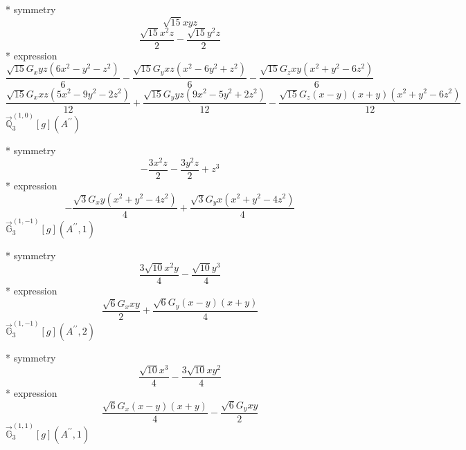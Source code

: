 \documentclass[fleqn,8pt]{jsarticle}
\begin{document}
\noindent\quad ** symmetry
\begin{dmath*}
\sqrt{15} x y z
\end{dmath*}
\begin{dmath*}
\frac{\sqrt{15} x^{2} z}{2} - \frac{\sqrt{15} y^{2} z}{2}
\end{dmath*}
\noindent\quad ** expression
\begin{dmath*}
\frac{\sqrt{15} G_{x} y z \left(6 x^{2} - y^{2} - z^{2}\right)}{6} - \frac{\sqrt{15} G_{y} x z \left(x^{2} - 6 y^{2} + z^{2}\right)}{6} - \frac{\sqrt{15} G_{z} x y \left(x^{2} + y^{2} - 6 z^{2}\right)}{6}
\end{dmath*}
\begin{dmath*}
\frac{\sqrt{15} G_{x} x z \left(5 x^{2} - 9 y^{2} - 2 z^{2}\right)}{12} + \frac{\sqrt{15} G_{y} y z \left(9 x^{2} - 5 y^{2} + 2 z^{2}\right)}{12} - \frac{\sqrt{15} G_{z} \left(x - y\right) \left(x + y\right) \left(x^{2} + y^{2} - 6 z^{2}\right)}{12}
\end{dmath*}
\noindent\quad $\vec{\mathbb{Q}}_{3}^{(1,0)}[g](A^{\prime\prime})$

\noindent\quad ** symmetry
\begin{dmath*}
- \frac{3 x^{2} z}{2} - \frac{3 y^{2} z}{2} + z^{3}
\end{dmath*}
\noindent\quad ** expression
\begin{dmath*}
- \frac{\sqrt{3} G_{x} y \left(x^{2} + y^{2} - 4 z^{2}\right)}{4} + \frac{\sqrt{3} G_{y} x \left(x^{2} + y^{2} - 4 z^{2}\right)}{4}
\end{dmath*}
\noindent\quad $\vec{\mathbb{G}}_{3}^{(1,-1)}[g](A^{\prime\prime},1)$

\noindent\quad ** symmetry
\begin{dmath*}
\frac{3 \sqrt{10} x^{2} y}{4} - \frac{\sqrt{10} y^{3}}{4}
\end{dmath*}
\noindent\quad ** expression
\begin{dmath*}
\frac{\sqrt{6} G_{x} x y}{2} + \frac{\sqrt{6} G_{y} \left(x - y\right) \left(x + y\right)}{4}
\end{dmath*}
\noindent\quad $\vec{\mathbb{G}}_{3}^{(1,-1)}[g](A^{\prime\prime},2)$

\noindent\quad ** symmetry
\begin{dmath*}
\frac{\sqrt{10} x^{3}}{4} - \frac{3 \sqrt{10} x y^{2}}{4}
\end{dmath*}
\noindent\quad ** expression
\begin{dmath*}
\frac{\sqrt{6} G_{x} \left(x - y\right) \left(x + y\right)}{4} - \frac{\sqrt{6} G_{y} x y}{2}
\end{dmath*}
\noindent\quad $\vec{\mathbb{G}}_{3}^{(1,1)}[g](A^{\prime\prime},1)$
\end{document}
